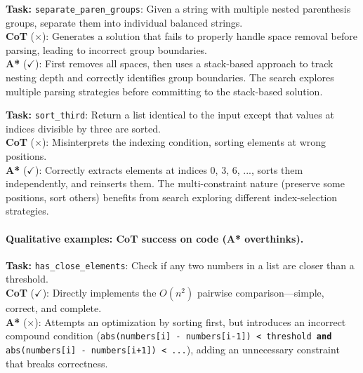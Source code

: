 \documentclass[11pt]{article}
\begin{document}
{{\begin{examplebox}[title=HumanEval/1 --- A* Correct{,} CoT Wrong]
\textbf{Task:} \texttt{separate\_paren\_groups}: Given a string with multiple nested parenthesis groups, separate them into individual balanced strings.\\[4pt]
\textbf{CoT} ($\times$): Generates a solution that fails to properly handle space removal before parsing, leading to incorrect group boundaries.\\[4pt]
\textbf{A*} ($\checkmark$): First removes all spaces, then uses a stack-based approach to track nesting depth and correctly identifies group boundaries. The search explores multiple parsing strategies before committing to the stack-based solution.
\end{examplebox}

\begin{examplebox}[title=HumanEval/33 --- A* Correct{,} CoT Wrong]
\textbf{Task:} \texttt{sort\_third}: Return a list identical to the input except that values at indices divisible by three are sorted.\\[4pt]
\textbf{CoT} ($\times$): Misinterprets the indexing condition, sorting elements at wrong positions.\\[4pt]
\textbf{A*} ($\checkmark$): Correctly extracts elements at indices 0, 3, 6, ..., sorts them independently, and reinserts them. The multi-constraint nature (preserve some positions, sort others) benefits from search exploring different index-selection strategies.
\end{examplebox}

\paragraph{Qualitative examples: CoT success on code (A* overthinks).}

\begin{examplebox}[title=HumanEval/0 --- CoT Correct{,} A* Wrong]
\textbf{Task:} \texttt{has\_close\_elements}: Check if any two numbers in a list are closer than a threshold.\\[4pt]
\textbf{CoT} ($\checkmark$): Directly implements the $O(n^2)$ pairwise comparison---simple, correct, and complete.\\[4pt]
\textbf{A*} ($\times$): Attempts an optimization by sorting first, but introduces an incorrect compound condition (\texttt{abs(numbers[i] - numbers[i-1]) < threshold \textbf{and} abs(numbers[i] - numbers[i+1]) < ...}), adding an unnecessary constraint that breaks correctness.
\end{examplebox}

}}
\end{document}
